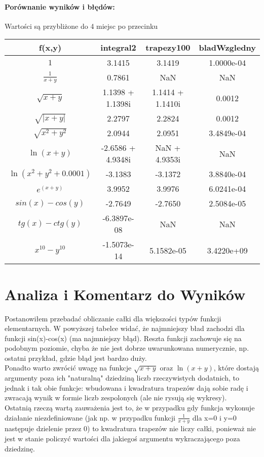 \documentclass{article}
\begin{document}
\paragraph{Porównanie wyników i błędów: \\}
Wartości są przybliżone do 4 miejsc po przecinku\\
\begin{tabular}{c|c|c|c}
    \hline
    f(x,y) & integral2 & trapezy100 & bladWzgledny \\
    \hline
         $1$ & 3.1415 & 3.1419 & 1.0000e-04 \\
    \hline
         $\frac{1}{x+y}$ & 0.7861 & NaN & NaN  \\
    \hline
         $\sqrt{x+y}$ & 1.1398 + 1.1398i & 1.1414 + 1.1410i & 0.0012 \\
    \hline
        $\sqrt{|x+y|}$ & 2.2797 & 2.2824 & 0.0012 \\
    \hline
        $\sqrt{x^2+y^2}$ & 2.0944 & 2.0951 & 3.4849e-04 \\
    \hline
        $\ln(x+y)$ & -2.6586 + 4.9348i & NaN + 4.9353i & NaN \\
    \hline
        $\ln(x^2+y^2 + 0.0001)$ & -3.1383 & -3.1372 & 3.8840e-04  \\
    \hline
        $e^{(x+y)}$ & 3.9952 & 3.9976 & 6.0241e-04 \\
    \hline
        $sin(x)-cos(y)$ & -2.7649 & -2.7650 & 2.5084e-05 \\
    \hline
        $tg(x)-ctg(y)$ & -6.3897e-08 & NaN & NaN \\
    \hline
        $x^{10}-y^{10}$ & -1.5073e-14 & 5.1582e-05 & 3.4220e+09
\end{tabular}

\section{Analiza i Komentarz do Wyników}
Postanowiłem przebadać obliczanie całki dla większości typów funkcji elementarnych. W powyższej tabelce widać, że najmniejszy bład zachodzi dla funkcji sin(x)-cos(x) (ma najmniejszy błąd). Reszta funkcji zachowuje się na podobnym poziomie, chyba że nie jest dobrze uwarunkowana numerycznie, np. ostatni przykład, gdzie błąd jest bardzo duży.\\
Ponadto warto zwrócić uwagę na funkcje $\sqrt{x+y}$ oraz $\ln(x+y)$, które dostają argumenty poza ich "naturalną" dziedziną liczb rzeczywistych dodatnich, to jednak i tak obie funkcje: wbudowana i kwadratura trapezów dają sobie radę i zwracają wynik w formie liczb zespolonych (ale nie rysują się wykresy).\\
Ostatnią rzeczą wartą zauważenia jest to, że w przypadku gdy funkcja wykonuje działanie niezdefiniowane (jak np. w przypadku funkcji $\frac{1}{x+y}$ dla x=0 i y=0 następuje dzielenie przez 0) to kwadratura trapezów nie liczy całki, ponieważ nie jest w stanie policzyć wartości dla jakiegoś argumentu wykraczającego poza dziedzinę.\\
\end{document}
